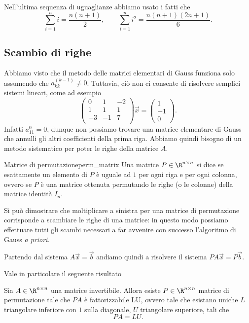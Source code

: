 \begin{remark}
    Nell'ultima sequenza di uguaglianze abbiamo usato i fatti che \[
        \sum_{i=1}^n i = \frac{n(n+1)}{2}, \qquad \sum_{i=1}^n i^2 = \frac{n(n+1)(2n+1)}{6}.
    \]
\end{remark}

\subsection{Scambio di righe}

Abbiamo visto che il metodo delle matrici elementari di Gauss funziona solo assumendo che $a_{kk}^{(k-1)} \neq 0$. Tuttavia, ciò non ci consente di risolvere semplici sistemi lineari, come ad esempio \[
    \begin{pmatrix}
        0 & 1 &-2\\
        1 & 1 & 1\\
        -3 & -1 &7\\
    \end{pmatrix}\vec x = \begin{pmatrix}
        1 \\ -1 \\ 0
    \end{pmatrix}.
\] Infatti $a_{11}^{0} = 0$, dunque non possiamo trovare una matrice elementare di Gauss che annulli gli altri coefficienti della prima riga. Abbiamo quindi bisogno di un metodo sistematico per poter  le righe della matrice $A$.

\begin{definition}
    {Matrice di permutazione}{perm_matrix}
    Una matrice $P \in \Mat{\R, n, n}$ si dice  se esattamente un elemento di $P$ è uguale ad $1$ per ogni riga e per ogni colonna, ovvero se $P$ è una matrice ottenuta permutando le righe (o le colonne) della matrice identità $I_n$.   
\end{definition}

Si può dimostrare che moltiplicare a sinistra per una matrice di permutazione corrisponde a scambiare le righe di una matrice: in questo modo possiamo effettuare tutti gli scambi necessari a far avvenire con successo l'algoritmo di Gauss \emph{a priori}.

Partendo dal sistema $A\vec x = \vec b$ andiamo quindi a risolvere il sistema $PA\vec x = P\vec b$.

Vale in particolare il seguente risultato
\begin{proposition}
    {}{}
    Sia $A \in \Mat{\R, n, n}$ una matrice invertibile. Allora esiste $P \in \Mat{\R, n, n}$ matrice di permutazione tale che $PA$ è fattorizzabile LU, ovvero tale che esistano uniche $L$ triangolare inferiore con $1$ sulla diagonale, $U$ triangolare superiore, tali che \[
        PA = LU.
    \]  
\end{proposition}